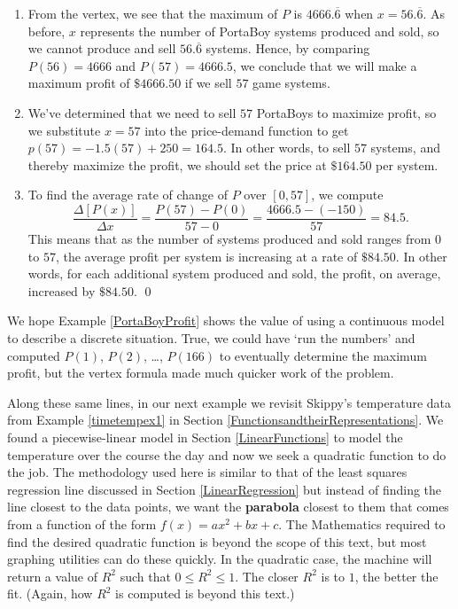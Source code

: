 \documentclass{ximera}
\begin{document}
\begin{example}
\begin{explanation}
\begin{enumerate}
\begin{center}
 \end{center}

\item   From the vertex, we see that the maximum of $P$ is $4666.\overline{6}$ when $x = 56.\overline{6}$.  As before, $x$ represents the number of PortaBoy systems produced and sold, so we cannot produce and sell  $56.\overline{6}$ systems.  Hence, by comparing  $P(56) = 4666$ and $P(57)=4666.5$,  we conclude that we will make a maximum profit of $\$ 4666.50$ if we sell $57$ game systems.

\item   We've determined that we need to sell $57$ PortaBoys to maximize profit, so we substitute $x=57$ into the price-demand function to get  $p(57) = -1.5(57)+250 = 164.5$.   In other words, to sell $57$ systems, and thereby maximize the profit, we should set the price at $\$164.50$ per system.

\item  To find the average rate of change of $P$ over $[0, 57]$, we compute \[ \frac{\Delta [P(x)]}{\Delta x} = \frac{P(57) - P(0)}{57-0} = \frac{4666.5 - (-150)}{57} = 84.5. \]This means that as the number of systems produced and sold ranges from $0$ to $57$, the average profit per system is increasing at a rate of $\$ 84.50$.  In other words, for each additional system produced and sold, the profit, on average, increased by $\$84.50$. \qed

\end{enumerate}
\end{explanation}
\end{example}

We hope Example \ref{PortaBoyProfit}  shows the value of using a continuous model to describe a discrete situation.  True, we could have `run the numbers' and computed $P(1)$, $P(2)$, \ldots,  $P(166)$ to eventually determine the maximum profit, but the vertex formula made much quicker work of the problem.  

\medskip

Along these same lines, in our next example we revisit Skippy's temperature data from Example \ref{timetempex1} in Section \ref{FunctionsandtheirRepresentations}.  We found a piecewise-linear model in Section \ref{LinearFunctions} to model the temperature over the course the day and now we seek a quadratic function to do the job.  The methodology used here is similar to that of the least squares regression line discussed in Section \ref{LinearRegression} but instead of finding the line closest to the data points, we want the \textbf{parabola} closest to them that comes from a function of the form $f(x) = ax^{2} + bx + c$.  The Mathematics required to find the desired quadratic function is beyond the scope of this text, but most graphing utilities can do these quickly.  In the quadratic case, the machine will return a value of $R^{2}$ such that $0 \leq R^{2} \leq 1$.  The closer $R^{2}$ is to $1$, the better the fit.  (Again, how $R^{2}$ is computed is beyond this text.)
\end{document}
